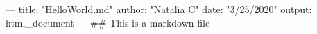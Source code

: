 ---
title: "HelloWorld.md"
author: "Natalia C"
date: "3/25/2020"
output: html_document
---
## This is a markdown file